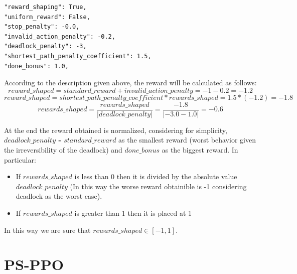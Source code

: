 \documentclass[11pt, a4paper, hidelinks]{report}
\begin{document}
\begin{lstlisting}[label={lst:rewards-params}]
"reward_shaping": True,
"uniform_reward": False,
"stop_penalty": -0.0,
"invalid_action_penalty": -0.2,
"deadlock_penalty": -3,
"shortest_path_penalty_coefficient": 1.5,
"done_bonus": 1.0,
\end{lstlisting}

According to the description given above, the reward will be calculated as follows:
\begin{equation*}
reward\_shaped = standard\_reward + invalid\_action\_penalty = -1 -0.2 = -1.2
\end{equation*}
\begin{equation*}
reward\_shaped = shortest\_path\_penalty\_coefficient * rewards\_shaped = 1.5 * (-1.2)= -1.8
\end{equation*}
\begin{equation*}
rewards\_shaped = \frac{rewards\_shaped}{|deadlock\_penalty|} = \frac{-1.8}{|-3.0 - 1.0|} = -0.6
\end{equation*}

At the end the reward obtained is normalized, considering for simplicity,  \textbf{$deadlock\_penalty$ - $standard\_reward$} as the smallest reward (worst behavior given the irreversibility of the deadlock) and \textbf{$done\_bonus$} as the biggest reward.
In particular:

\begin{itemize}
	\item If $rewards\_shaped$ is less than 0 then it is divided by the absolute value $deadlock\_penalty$ (In this way the worse reward obtainible is -1 considering deadlock as the worst case).
	\item If $rewards\_shaped$ is greater than 1 then it is placed at 1 
\end{itemize}

In this way we are sure that $rewards\_shaped \in [-1, 1]$.

\section{PS-PPO}\label{sec:ps-ppo}
\end{document}
